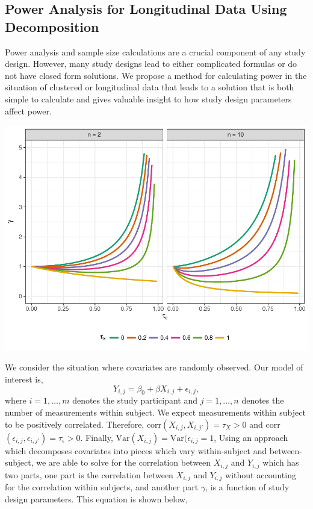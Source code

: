 \documentclass[12pt]{article}
\begin{document}
\begin{multicols}{2}
\subsection*{Power Analysis for Longitudinal Data Using Decomposition}
Power analysis and sample size calculations are a crucial component of any study design. However, many study designs lead to either complicated formulas or do not have closed form solutions. We propose a method for calculating power in the situation of clustered or longitudinal data that leads to a solution that is both simple to calculate and gives valuable insight to how study design parameters affect power.
\begin{center}\vspace{.5cm}
\includegraphics[width=1\linewidth]{gamma_analysis.pdf}
\label{fig:gamma}
\end{center}\vspace{.5cm}
\hspace{.5cm}We consider the situation where covariates are randomly observed. Our model of interest is,
\begin{equation} \label{eq:model}
Y_{i,j}=\beta_0+ \beta X_{i,j}+ \epsilon_{i,j},
\end{equation}
where $i=1,\ldots, m$ denotes the study participant and $j=1,\ldots,n$ denotes the number of measurements within subject. We expect measurements within subject to be positively correlated. Therefore, corr$(X_{i,j},X_{i,j'}) = \tau_X >0$ and corr$(\epsilon_{i,j},\epsilon_{i,j'}) = \tau_\epsilon>0$. Finally, $\mbox{Var}(X_{i,j}) = \mbox{Var}(\epsilon_{i,j} =1$, Using an approach which decomposes covariates into pieces which vary within-subject and between-subject, we are able to solve for the correlation between $X_{i,j}$ and $Y_{i,j}$ which has two parts, one part is the correlation between $X_{i,j}$ and $Y_{i,j}$ without accounting for the correlation within subjects, and another part $\gamma$, is a function of study design parameters. This equation is shown below, 

\end{multicols}
\end{document}

